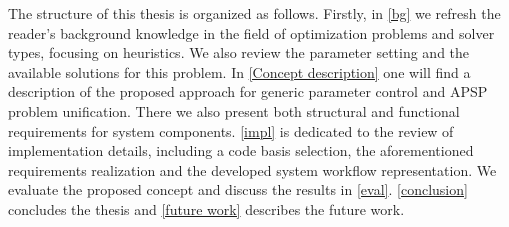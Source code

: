 The structure of this thesis is organized as follows. Firstly, in \cref{bg} we refresh the reader's background knowledge in the field of optimization problems and solver types, focusing on heuristics. We also review the parameter setting and the available solutions for this problem. In \cref{Concept description} one will find a description of the proposed approach for generic parameter control and APSP problem unification. There we also present both structural and functional requirements for system components. \cref{impl} is dedicated to the review of implementation details, including a code basis selection, the aforementioned requirements realization and the developed system workflow representation. We evaluate the proposed concept and discuss the results in \cref{eval}. \cref{conclusion} concludes the thesis and \cref{future work} describes the future work.
